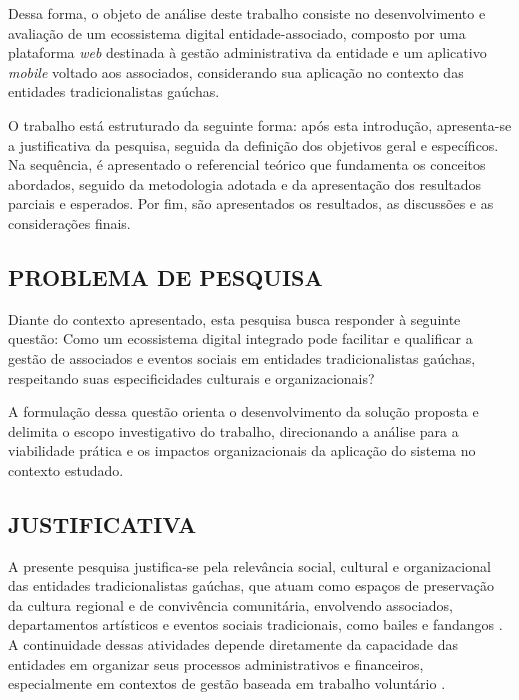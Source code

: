 ﻿\documentclass[12pt,a4paper]{article}
\begin{document}
Dessa forma, o objeto de análise deste trabalho consiste no desenvolvimento e avaliação de um ecossistema digital entidade-associado, composto por uma plataforma \textit{web} destinada à gestão administrativa da entidade e um aplicativo \textit{mobile} voltado aos associados, considerando sua aplicação no contexto das entidades tradicionalistas gaúchas.

O trabalho está estruturado da seguinte forma: após esta introdução, apresenta-se a justificativa da pesquisa, seguida da definição dos objetivos geral e específicos. Na sequência, é apresentado o referencial teórico que fundamenta os conceitos abordados, seguido da metodologia adotada e da apresentação dos resultados parciais e esperados. Por fim, são apresentados os resultados, as discussões e as considerações finais.

\subsection{PROBLEMA DE PESQUISA}

Diante do contexto apresentado, esta pesquisa busca responder à seguinte questão: Como um ecossistema digital integrado pode facilitar e qualificar a gestão de associados e eventos sociais em entidades tradicionalistas gaúchas, respeitando suas especificidades culturais e organizacionais?

A formulação dessa questão orienta o desenvolvimento da solução proposta e delimita o escopo investigativo do trabalho, direcionando a análise para a viabilidade prática e os impactos organizacionais da aplicação do sistema no contexto estudado.

\subsection{JUSTIFICATIVA}

A presente pesquisa justifica-se pela relevância social, cultural e organizacional das entidades tradicionalistas gaúchas, que atuam como espaços de preservação da cultura regional e de convivência comunitária, envolvendo associados, departamentos artísticos e eventos sociais tradicionais, como bailes e fandangos \citep{uliana2019,savaris2022}. A continuidade dessas atividades depende diretamente da capacidade das entidades em organizar seus processos administrativos e financeiros, especialmente em contextos de gestão baseada em trabalho voluntário \citep{fabricio2019,silvaalbarello2024}.
\end{document}
